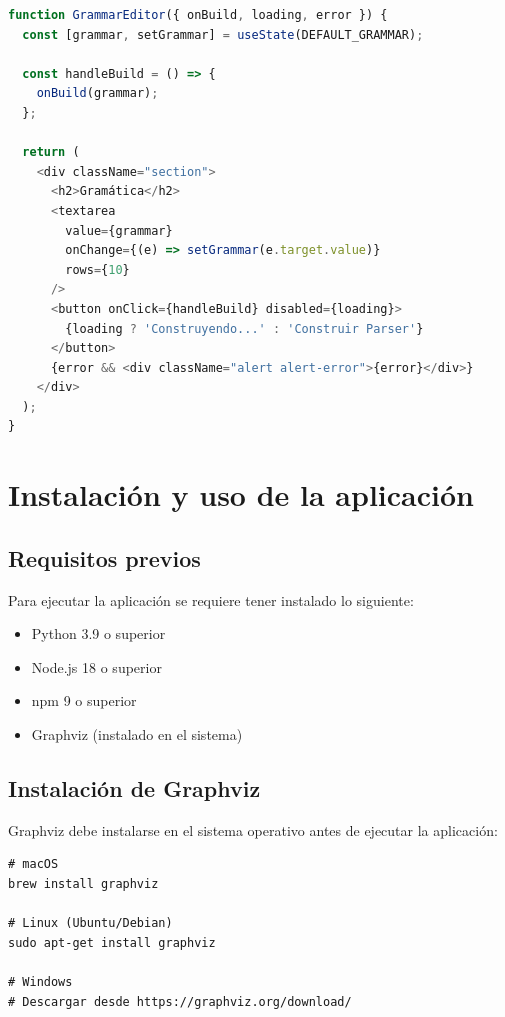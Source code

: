 \documentclass[12pt,a4paper]{article}
\begin{document}
\begin{lstlisting}[style=myjavascript, language=JavaScript, caption={Componente para editar y construir la gramática.}]
function GrammarEditor({ onBuild, loading, error }) {
  const [grammar, setGrammar] = useState(DEFAULT_GRAMMAR);

  const handleBuild = () => {
    onBuild(grammar);
  };

  return (
    <div className="section">
      <h2>Gramática</h2>
      <textarea
        value={grammar}
        onChange={(e) => setGrammar(e.target.value)}
        rows={10}
      />
      <button onClick={handleBuild} disabled={loading}>
        {loading ? 'Construyendo...' : 'Construir Parser'}
      </button>
      {error && <div className="alert alert-error">{error}</div>}
    </div>
  );
}
\end{lstlisting}

\section{Instalación y uso de la aplicación}

\subsection{Requisitos previos}

Para ejecutar la aplicación se requiere tener instalado lo siguiente:
\begin{itemize}
  \item Python 3.9 o superior
  \item Node.js 18 o superior
  \item npm 9 o superior
  \item Graphviz (instalado en el sistema)
\end{itemize}

\subsection{Instalación de Graphviz}

Graphviz debe instalarse en el sistema operativo antes de ejecutar la aplicación:

\begin{verbatim}
# macOS
brew install graphviz

# Linux (Ubuntu/Debian)
sudo apt-get install graphviz

# Windows
# Descargar desde https://graphviz.org/download/
\end{verbatim}
\end{document}
